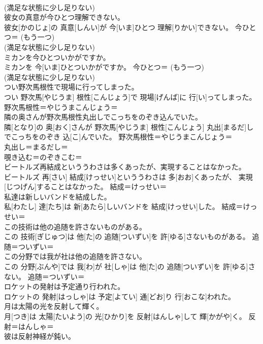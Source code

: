 \documentclass[8pt]{extreport}
\begin{document}
\begin{CJK}{UTF8}{min}
{\\	(満足な状態に少し足りない) 
\\	彼女の真意が今ひとつ理解できない。	
\\	彼女[かのじょ]の 真意[しんい]が 今[いま]ひとつ 理解[りかい]できない。	今ひとつ＝ (もう一つ) 
\\	(満足な状態に少し足りない) 
\\	ミカンを今ひとついかがですか。	
\\	ミカンを 今[いま]ひとついかがですか。	今ひとつ＝ (もう一つ) 
\\	(満足な状態に少し足りない) 
\\	つい野次馬根性で現場に行ってしまった。	
\\	つい 野次馬[やじうま] 根性[こんじょう]で 現場[げんば]に 行[い]ってしまった。	野次馬根性＝やじうまこんじょう＝ 
\\	隣の奥さんが野次馬根性丸出しでこっちをのぞき込んでいた。	
\\	隣[となり]の 奥[おく]さんが 野次馬[やじうま] 根性[こんじょう] 丸出[まるだ]しでこっちをのぞき 込[こ]んでいた。	野次馬根性＝やじうまこんじょう＝ 
\\	丸出し＝まるだし＝ 
\\	覗き込む＝のぞきこむ＝ 
\\	ビートルズ再結成といううわさは多くあったが、実現することはなかった。	
\\	ビートルズ 再[さい] 結成[けっせい]といううわさは 多[おお]くあったが、 実現[じつげん]することはなかった。	結成＝けっせい＝ 
\\	私達は新しいバンドを結成した。	
\\	私[わたし] 達[たち]は 新[あたら]しいバンドを 結成[けっせい]した。	結成＝けっせい＝ 
\\	この技術は他の追随を許さないものがある。	
\\	この 技術[ぎじゅつ]は 他[た]の 追随[ついずい]を 許[ゆる]さないものがある。	追随＝ついずい＝ 
\\	この分野では我が社は他の追随を許さない。	
\\	この 分野[ぶんや]では 我[わ]が 社[しゃ]は 他[た]の 追随[ついずい]を 許[ゆる]さない。	追随＝ついずい＝ 
\\	ロケットの発射は予定通り行われた。	
\\	ロケットの 発射[はっしゃ]は 予定[よてい] 通[どお]り 行[おこな]われた。	
\\	月は太陽の光を反射して輝く。	
\\	月[つき]は 太陽[たいよう]の 光[ひかり]を 反射[はんしゃ]して 輝[かがや]く。	反射＝はんしゃ＝ 
\\	彼は反射神経が鈍い。	
}
\end{CJK}
\end{document}
